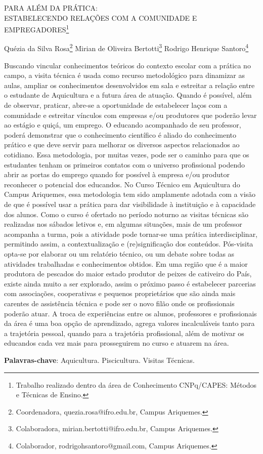\documentclass[article,12pt,onesidea,4paper,english,brazil]{abntex2}
\begin{document}
	
	
	\frenchspacing 
	
	\begin{center}
		\LARGE PARA ALÉM DA PRÁTICA:\\ ESTABELECENDO RELAÇÕES COM A
		COMUNIDADE E EMPREGADORES\footnote{Trabalho realizado dentro da área de Conhecimento CNPq/CAPES: Métodos e Técnicas de Ensino.}
		
		\normalsize
	Quézia da Silva Rosa\footnote{Coordenadora, quezia.rosa@ifro.edu.br, Campus Ariquemes.} 
	Mirian de Oliveira Bertotti\footnote{Colaboradora, mirian.bertotti@ifro.edu.br, Campus Ariquemes.}
	Rodrigo Henrique Santoro\footnote{Colaborador, rodrigohsantoro@gmail.com, Campus Ariquemes.} 
	\end{center}
	
	\noindent Buscando vincular conhecimentos teóricos do contexto escolar com a prática no
	campo, a visita técnica é usada como recurso metodológico para dinamizar as aulas,
	ampliar os conhecimentos desenvolvidos em sala e estreitar a relação entre o
	estudante de Aquicultura e a futura área de atuação. Quando é possível, além de
	observar, praticar, abre-se a oportunidade de estabelecer laços com a comunidade e
	estreitar vínculos com empresas e/ou produtores que poderão levar ao estágio e
	quiçá, um emprego. O educando acompanhado de seu professor, poderá
	demonstrar que o conhecimento científico é aliado do conhecimento prático e que
	deve servir para melhorar os diversos aspectos relacionados ao cotidiano. Essa
	metodologia, por muitas vezes, pode ser o caminho para que os estudantes tenham
	os primeiros contatos com o universo profissional podendo abrir as portas do
	emprego quando for possível à empresa e/ou produtor reconhecer o potencial dos
	educandos. No Curso Técnico em Aquicultura do Campus Ariquemes, essa
	metodologia tem sido amplamente adotada com a visão de que é possível usar a
	prática para dar visibilidade à instituição e à capacidade dos alunos. Como o curso é
	ofertado no período noturno as visitas técnicas são realizadas nos sábados letivos e,
	em algumas situações, mais de um professor acompanha a turma, pois a atividade
	pode tornar-se uma prática interdisciplinar, permitindo assim, a contextualização e
	(re)significação dos conteúdos. Pós-visita opta-se por elaborar ou um relatório
	técnico, ou um debate sobre todas as atividades trabalhadas e conhecimentos
	obtidos. Em uma região que é a maior produtora de pescados do maior estado
	produtor de peixes de cativeiro do País, existe ainda muito a ser explorado, assim o
	próximo passo é estabelecer parcerias com associações, cooperativas e pequenos
	proprietários que são ainda mais carentes de assistência técnica e pode ser o novo
	filão onde os profissionais poderão atuar. A troca de experiências entre os alunos,
	professores e profissionais da área é uma boa opção de aprendizado, agrega
	valores incalculáveis tanto para a trajetória pessoal, quando para a trajetória
	profissional, além de motivar os educandos cada vez mais para prosseguirem no
	curso e atuarem na área.
	
	\vspace{\onelineskip}
	
	\noindent
	\textbf{Palavras-chave}: Aquicultura. Piscicultura. Visitas Técnicas.
	
\end{document}

